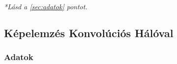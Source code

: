 \textit{*Lásd a \ref{sec:adatok} pontot.}
%
%
%
%
%
%


\newpage
\subsection{Képelemzés Konvolúciós Hálóval}
\label{sec:cnn}


\subsubsection{Adatok}


